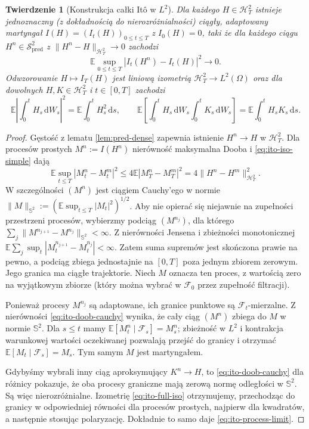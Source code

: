 \documentclass[11pt,a4paper,oneside]{report}
\numberwithin{equation}{chapter}
\theoremstyle{plain}
\newtheorem{twierdzenie}{Twierdzenie}[chapter]
\theoremstyle{definition}
\theoremstyle{remark}
\newcommand{\E}{\mathbb{E}}
\newcommand{\calF}{\mathcal{F}}
\newcommand{\calH}{\mathcal{H}}
\newcommand{\calS}{\mathcal{S}}
\newcommand{\dd}{\mathrm{d}}
\newcommand{\norm}[1]{\lVert #1\rVert}
\begin{document}
\begin{twierdzenie}[Konstrukcja całki Itô w $L^2$]\label{th:ito-extension}
Dla każdego $H\in\calH_T^2$ istnieje jednoznaczny
(z dokładnością do nierozróżnialności) ciągły,
adaptowany martyngał $I(H)=(I_t(H))_{0\le t\le T}$
z $I_0(H)=0$, taki że dla każdego ciągu
$H^n\in\calS_{\mathrm{pred}}^2$ z
$\norm{H^n-H}_{\calH_T^2}\to0$ zachodzi
\[
\E\sup_{0\le t\le T}|I_t(H^n)-I_t(H)|^2\longrightarrow0.
\tag{2.6}\label{eq:ito-process-limit}
\]
Odwzorowanie $H\mapsto I_T(H)$ jest liniową izometrią
$\calH_T^2\to L^2(\Omega)$ oraz dla dowolnych
$H,K\in\calH_T^2$ i $t\in[0,T]$ zachodzi
\[
\E\left|\int_0^tH_s\,\dd W_s\right|^2
=\E\int_0^tH_s^2\,\dd s,
\qquad
\E\left[\int_0^tH_s\,\dd W_s\int_0^tK_s\,\dd W_s\right]
=\E\int_0^tH_sK_s\,\dd s.
\tag{2.7}\label{eq:ito-full-iso}
\]
\end{twierdzenie}
\begin{proof}
Gęstość z lematu \ref{lem:pred-dense} zapewnia istnienie
$H^n\to H$ w $\calH_T^2$. Dla procesów prostych
$M^n:=I(H^n)$ nierówność maksymalna Dooba i
\eqref{eq:ito-iso-simple} dają
\[
\E\sup_{t\le T}|M_t^n-M_t^m|^2
\le4\E|M_T^n-M_T^m|^2
=4\norm{H^n-H^m}_{\calH_T^2}^2.
\tag{2.8}\label{eq:ito-doob-cauchy}
\]
W szczególności $(M^n)$ jest ciągiem Cauchy'ego
w normie $\norm{M}_{\mathbb S^2}:=(\E\sup_{t\le T}|M_t|^2)^{1/2}$.
Aby nie opierać się niejawnie na zupełności przestrzeni
procesów, wybierzmy podciąg $(M^{n_j})$, dla którego
$\sum_j\norm{M^{n_{j+1}}-M^{n_j}}_{\mathbb S^2}<\infty$.
Z nierówności Jensena i zbieżności monotonicznej
$\E\sum_j\sup_t|M_t^{n_{j+1}}-M_t^{n_j}|<\infty$.
Zatem suma supremów jest skończona prawie na pewno,
a podciąg zbiega jednostajnie na $[0,T]$ poza jednym
zbiorem zerowym. Jego granica ma ciągłe trajektorie.
Niech $M$ oznacza ten proces, z wartością zero na
wyjątkowym zbiorze (który można wybrać w $\calF_0$
przez zupełność filtracji).

Ponieważ procesy $M^{n_j}$ są adaptowane, ich granice
punktowe są $\calF_t$-mierzalne. Z nierówności
\eqref{eq:ito-doob-cauchy} wynika, że cały ciąg
$(M^n)$ zbiega do $M$ w normie $\mathbb S^2$.
Dla $s\le t$ mamy
$\E[M_t^n\mid\calF_s]=M_s^n$; zbieżność w $L^2$
i kontrakcja warunkowej wartości oczekiwanej pozwalają
przejść do granicy i otrzymać $\E[M_t\mid\calF_s]=M_s$.
Tym samym $M$ jest martyngałem.

Gdybyśmy wybrali inny ciąg aproksymujący $K^n\to H$,
to \eqref{eq:ito-doob-cauchy} dla różnicy pokazuje,
że oba procesy graniczne mają zerową normę odległości
w $\mathbb S^2$. Są więc nierozróżnialne.
Izometrię \eqref{eq:ito-full-iso} otrzymujemy,
przechodząc do granicy w odpowiedniej równości dla
procesów prostych, najpierw dla kwadratów, a następnie
stosując polaryzację. Dokładnie to samo daje
\eqref{eq:ito-process-limit}.
\end{proof}
\end{document}
